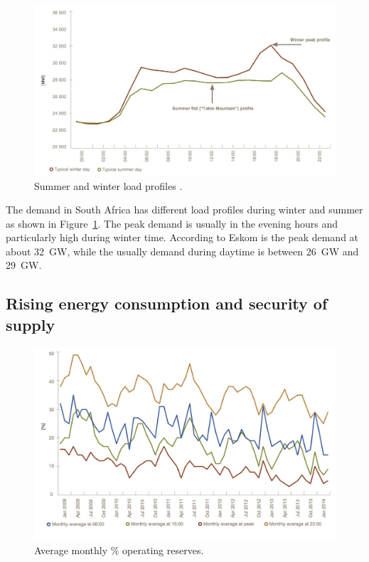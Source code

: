 \begin{figure}[!h] %
\centering
\includegraphics[width=0.9\linewidth]{FIG/SummerWinterDemand}
\caption[Summer and winter load profiles.]{Summer and winter load profiles \cite{Eskom2014}.}\label{DEMAND}
\end{figure}


The demand in South Africa has different load profiles during winter and summer as shown in Figure~\ref{DEMAND}. The peak demand is usually in the evening hours and particularly high during winter time. According to Eskom is the peak demand at about 32~GW, while the usually demand during daytime is between 26~GW and 29~GW. \cite{Eskom2014}

\subsection{Rising energy consumption and security of supply}

\begin{figure}[!h] %
\centering
\includegraphics[width=0.9\linewidth]{FIG/AveragemonthlySA}
\caption[Average monthly \% operating reserves.]{Average monthly \% operating reserves\cite{Eskom2014}.}\label{Abb1}
\end{figure}


